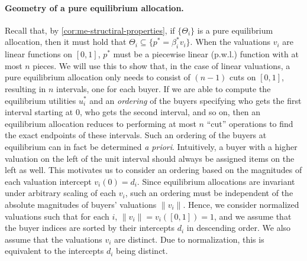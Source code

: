 \paragraph{Geometry of a pure equilibrium allocation.} 
Recall that, by \cref{cor:me-structiral-properties}, if $\{\Theta_i\}$ is a pure equilibrium allocation, then it must hold that $\Theta_i \subseteq \{p^* = \beta^*_i v_i \}$. 
When the valuations $v_i$ are linear functions on $[0,1]$, $p^*$ must be a piecewise linear (p.w.l.) function with at most $n$ pieces. 
We will use this to show that, in the case of linear valuations, a pure equilibrium allocation only needs to consist of $(n-1)$ cuts on $[0,1]$, resulting in $n$ intervals, one for each buyer. 
If we are able to compute the equilibrium utilities $u^*_i$ and an \emph{ordering} of the buyers specifying who gets the first interval starting at $0$, who gets the second interval, and so on, then an equilibrium allocation reduces to performing at most $n$ ``cut'' operations to find the exact endpoints of these intervals. 
Such an ordering of the buyers at equilibrium can in fact be determined \emph{a priori}. 
Intuitively, a buyer with a higher valuation on the left of the unit interval should always be assigned items on the left as well. 
This motivates us to consider an ordering based on the magnitudes of each valuation intercept $v_i(0) = d_i$. 
Since equilibrium allocations are invariant under arbitrary scaling of each $v_i$, such an ordering must be independent of the absolute magnitudes of buyers' valuations $\|v_i\|$. 
Hence, we consider normalized valuations such that for each $i$, $\|v_i\| = v_i([0,1]) = 1$, and we assume that the buyer indices are sorted by their intercepts $d_i$ in descending order. 
We also assume that the valuations $v_i$ are distinct. Due to normalization, this is equivalent to the intercepts $d_i$ being distinct. 

